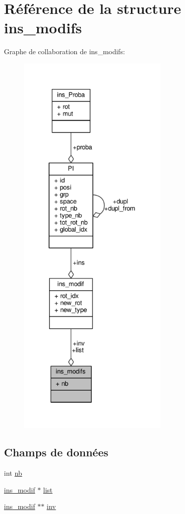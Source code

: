 \hypertarget{structins__modifs}{\section{Référence de la structure ins\+\_\+modifs}
\label{structins__modifs}
}


Graphe de collaboration de ins\+\_\+modifs\+:\nopagebreak
\begin{figure}[H]
\begin{center}
\leavevmode
\includegraphics[height=550pt]{structins__modifs__coll__graph}
\end{center}
\end{figure}
\subsection*{Champs de données}
\begin{DoxyCompactItemize}
\item 
int \hyperlink{structins__modifs_aa4cf2947c9ecaf7d35d4eb9d2da4c7e7}{nb}
\item 
\hyperlink{structins__modif}{ins\+\_\+modif} $\ast$ \hyperlink{structins__modifs_ad0423084c60b32fa9d0cceea943dfb29}{list}
\item 
\hyperlink{structins__modif}{ins\+\_\+modif} $\ast$$\ast$ \hyperlink{structins__modifs_aac36a2150609ffb8ad29a13284470d79}{inv}
\end{DoxyCompactItemize}


